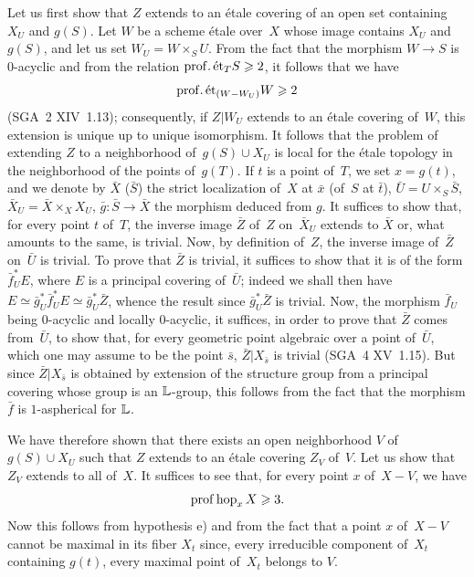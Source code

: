 Let us first show that $Z$ extends to an \'etale covering
of an open set containing $X_U$ and $g(S)$. Let $W$ be a scheme
\'etale over~$X$ whose image contains $X_U$ and $g(S)$, and let us set
$W_U=W\times_S U$. From the fact that the morphism $W\to S$ is $0$-acyclic
and from the relation $\mathrm{prof}.\,\mathrm{\acute{e}t}_T S\geqslant 2$, it follows that we have
$$
\mathrm{prof}.\,\mathrm{\acute{e}t}_{(W-W_U)} W\geqslant 2
$$
(SGA~2 XIV~1.13); consequently, if $Z|W_U$ extends to an
\'etale covering of~$W$, this extension is unique up to
unique isomorphism. It follows that the problem of
extending $Z$ to a neighborhood of~$g(S)\cup X_U$ is local for the
\'etale topology in the neighborhood of the points of~$g(T)$. If $t$ is a
point of~$T$, we set $x=g(t)$, and we denote by $\bar{X}$ (\resp $\bar{S}$)
the strict localization of~$X$ at $\bar{x}$ (\resp of~$S$ at
$\bar{t}$), $\bar{U}=U\times_S \bar{S}$, $\bar{X}_U=\bar{X}\times_X
X_U$, $\bar{g}\colon\bar{S}\to\bar{X}$ the morphism deduced from
$g$. It suffices to show that, for every point $t$ of~$T$, the inverse
image $\bar{Z}$ of~$Z$ on~$\bar{X}_U$ extends to $\bar{X}$
or, what amounts to the same, is trivial. Now, by definition
of~$Z$, the inverse image of~$\bar{Z}$ on~$\bar{U}$ is
trivial. To prove that $\bar{Z}$ is trivial, it suffices to show
that it is of the form $\bar{f}^*_U E$, where $E$ is a
principal covering of~$\bar{U}$; indeed we shall then have
$E\simeq\bar{g}^*_U\bar{f}^*_U E \simeq\bar{g}^*_U\bar{Z}$, whence
the result since $\bar{g}^*_U\bar{Z}$ is trivial. Now, the
morphism $\bar{f}_U$ being $0$-acyclic and locally $0$-acyclic,
it suffices, in order to prove that $\bar{Z}$ comes from~$\bar{U}$, to
show that, for every geometric point algebraic over a
point of~$\bar{U}$, which one may assume to be the point
$\bar{s}$, $\bar{Z}|X_{\bar{s}}$ is trivial (SGA~4 XV~1.15). But since
$\bar{Z}|X_{\bar{s}}$ is obtained by extension of the structure
group from a principal covering whose group is an
$\mathbb{L}$-group, this follows from the fact that the morphism $\bar{f}$ is
$1$-aspherical for $\mathbb{L}$.

We
have therefore shown that there exists an open neighborhood $V$ of
$g(S)\cup X_U$ such that $Z$ extends to an \'etale covering
$Z_V$ of~$V$. Let us show that $Z_V$ extends to all of~$X$.
It suffices to see that, for every point $x$ of~$X-V$, we have
$$
\operatorname{prof}\operatorname{hop}_x X\geqslant 3.
$$
Now this follows from hypothesis e) and from the fact that a point $x$
of~$X-V$ cannot be maximal in its fiber $X_t$ since, every
irreducible component of~$X_t$ containing $g(t)$, every maximal
point of~$X_t$ belongs to $V$.

